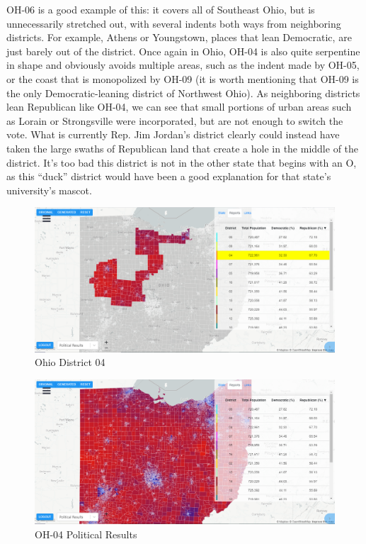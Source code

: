 \documentclass[letterpaper]{article}
\begin{document}
OH-06 is a good example of this: it covers all of Southeast Ohio, but is unnecessarily stretched out, with several indents both ways from neighboring districts. For example, Athens or Youngstown, places that lean Democratic, are just barely out of the district. Once again in Ohio, OH-04 is also quite serpentine in shape and obviously avoids multiple areas, such as the indent made by OH-05, or the coast that is monopolized by OH-09 (it is worth mentioning that OH-09 is the only Democratic-leaning district of Northwest Ohio). As neighboring districts lean Republican like OH-04, we can see that small portions of urban areas such as Lorain or Strongsville were incorporated, but are not enough to switch the vote. What is currently Rep. Jim Jordan’s district clearly could instead have taken the large swaths of Republican land that create a hole in the middle of the district. It’s too bad this district is not in the other state that begins with an O, as this “duck” district would have been a good explanation for that state’s university’s mascot.

\begin{figure}[H]
	\includegraphics[width=\linewidth]{./figures/OH-04.png}
	\caption{Ohio District 04}
	\label{fig:oh04border}
\end{figure}

\begin{figure}[H]
	\includegraphics[width=\linewidth]{./figures/OH-04-SurroundingArea.png}
	\caption{OH-04 Political Results}
	\label{fig:oh04political}
\end{figure}
\end{document}
